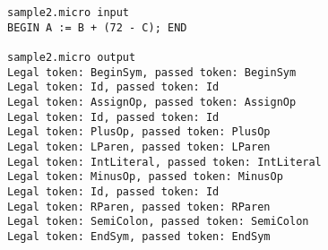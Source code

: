 \documentclass[a4paper]{article}
\begin{document}
\begin{verbatim}
sample2.micro input
BEGIN A := B + (72 - C); END

sample2.micro output
Legal token: BeginSym, passed token: BeginSym
Legal token: Id, passed token: Id
Legal token: AssignOp, passed token: AssignOp
Legal token: Id, passed token: Id
Legal token: PlusOp, passed token: PlusOp
Legal token: LParen, passed token: LParen
Legal token: IntLiteral, passed token: IntLiteral
Legal token: MinusOp, passed token: MinusOp
Legal token: Id, passed token: Id
Legal token: RParen, passed token: RParen
Legal token: SemiColon, passed token: SemiColon
Legal token: EndSym, passed token: EndSym
\end{verbatim}
\end{document}
